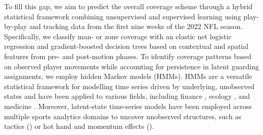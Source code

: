 \documentclass[namedate,webpdf,modern,medium]{oup-authoring-template}
\begin{document}
To fill this gap, we aim to predict the overall coverage scheme through a hybrid statistical framework combining unsupervised and supervised learning using play-by-play and tracking data from the first nine weeks of the 2022 NFL season. Specifically, we classify man- or zone coverage with an elastic net logistic regression and gradient-boosted decision trees based on contextual and spatial features from pre- and post-motion phases. 
To identify coverage patterns based on observed player movements while accounting for persistence in latent guarding assignments, we employ hidden Markov models (HMMs).
HMMs are a versatile statistical framework for modelling time series driven by underlying, unobserved states and have been applied to various fields, including finance \citep{liu2012stock, zhang2019high}, ecology \citep{mcclintock2020uncovering, mews2022multistate}, and medicine \citep{amoros2019continuous, soper2020hidden}.
Moreover, latent-state time-series models have been employed across multiple sports analytics domains to uncover unobserved structures, such as tactics (\citealp{otting2023football, adam2024markov}) or hot hand and momentum effects (\citealp{albert93, michels2023bettors, winkelmann2025momentum}).
\end{document}
